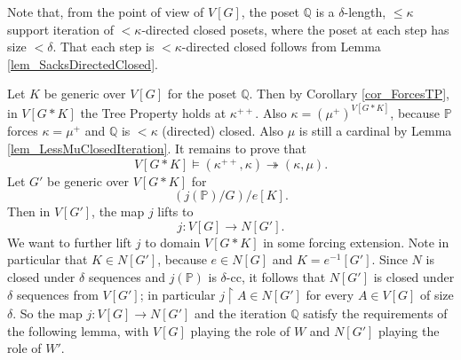 \documentclass{amsart}
\begin{document}
Note that, from the point of view of $V[G]$, the poset $\mathbb{Q}$ is a $\delta$-length, $\le \kappa$ support iteration of $<\kappa$-directed closed posets, where the poset at each step has size $<\delta$.  That each step is $<\kappa$-directed closed follows from Lemma \ref{lem_SacksDirectedClosed}.

Let $K$ be generic over $V[G]$ for the poset $\mathbb{Q}$.  Then by Corollary \ref{cor_ForcesTP}, in $V[G*K]$ the Tree Property holds at $\kappa^{++}$.  Also $\kappa = (\mu^+)^{V[G*K]}$, because $\mathbb{P}$ forces $\kappa = \mu^+$ and $\mathbb{Q}$ is $<\kappa$ (directed) closed.  Also $\mu$ is still a cardinal by Lemma \ref{lem_LessMuClosedIteration}.  It remains to prove that 
\[
V[G*K] \models (\kappa^{++}, \kappa) \twoheadrightarrow (\kappa, \mu).
\]
Let $G'$ be generic over $V[G*K]$ for 
\[
(j(\mathbb{P})/G)/e[K].
\]
Then in $V[G']$, the map $j$ lifts to
\[
j: V[G] \to N[G'].
\]
We want to further lift $j$ to domain $V[G*K]$ in some forcing extension.  Note in particular that $K \in N[G']$, because $e \in N[G]$ and $K = e^{-1}[G']$.  Since $N$ is closed under $\delta$ sequences and $j(\mathbb{P})$ is $\delta$-cc, it follows that $N[G']$ is closed under $\delta$ sequences from $V[G']$; in particular $j \restriction A \in N[G']$ for every $A \in V[G]$ of size $\delta$.  So the map $j: V[G] \to N[G']$ and the iteration $\mathbb{Q}$ satisfy the requirements of the following lemma, with $V[G]$ playing the role of $W$ and $N[G']$ playing the role of $W'$.
\end{document}
